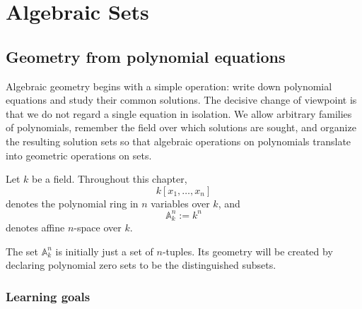 %
%

\chapter{Algebraic Sets}
\label{ch:vi-algebraic-sets}

\section{Geometry from polynomial equations}
\label{sec:vi01-motivation}

Algebraic geometry begins with a simple operation: write down polynomial equations and
study their common solutions.  The decisive change of viewpoint is that we do not regard a
single equation in isolation.  We allow arbitrary families of polynomials, remember the
field over which solutions are sought, and organize the resulting solution sets so that
algebraic operations on polynomials translate into geometric operations on sets.

Let \(k\) be a field.  Throughout this chapter,
\[
  k[x_1,\dots,x_n]
\]
denotes the polynomial ring in \(n\) variables over \(k\), and
\[
  \mathbb A_k^n := k^n
\]
denotes affine \(n\)-space over \(k\).

The set \(\mathbb A_k^n\) is initially just a set of \(n\)-tuples.  Its geometry will be
created by declaring polynomial zero sets to be the distinguished subsets.

\subsection*{Learning goals}

